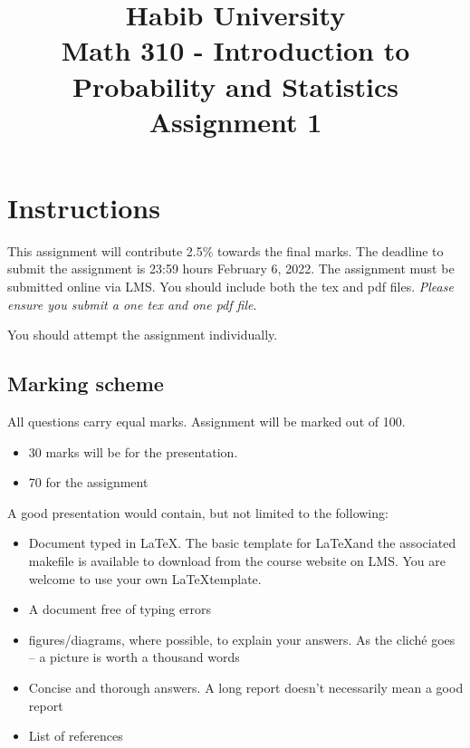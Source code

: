 \documentclass[answers]{exam}
\title{Habib University\\Math 310 - Introduction to Probability and Statistics\\Assignment 1}
\author{}
\begin{document}
\setlength{\parskip}{10pt}
\setlength{\parindent}{0pt}
\maketitle

\section{Instructions}
This assignment will contribute 2.5\% towards the final marks. The deadline to submit the assignment is 23:59 hours  February 6, 2022. The assignment must be submitted online via LMS. You should include both the tex and pdf files. \emph{Please ensure you submit a one tex and one pdf file}.

You should attempt the assignment individually.
\subsection{Marking scheme}
All questions carry equal marks. Assignment will be marked out of 100. 
\begin{itemize}
  \item 30 marks will be for the presentation.  
  \item 70 for the assignment
\end{itemize}

A good presentation would contain, but not limited to the following:
\begin{itemize}
   \item Document typed in \LaTeX. The basic template for \LaTeX and the associated makefile is available to download from the course website on LMS. You are welcome to use your own \LaTeX template.
   \item A document free of typing errors
   \item figures/diagrams, where possible, to explain your answers. As the clich\'e goes -- a picture is worth a thousand words
   \item Concise and thorough answers. A long report doesn't necessarily mean a good report
   \item List of references
 \end{itemize}
\end{document}
